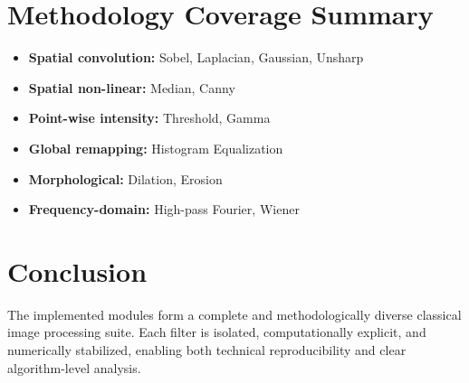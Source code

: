 \documentclass[11pt,a4paper]{article}
\begin{document}
\section{Methodology Coverage Summary}
\begin{itemize}[leftmargin=1.2cm]
  \item \textbf{Spatial convolution:} Sobel, Laplacian, Gaussian, Unsharp
  \item \textbf{Spatial non-linear:} Median, Canny
  \item \textbf{Point-wise intensity:} Threshold, Gamma
  \item \textbf{Global remapping:} Histogram Equalization
  \item \textbf{Morphological:} Dilation, Erosion
  \item \textbf{Frequency-domain:} High-pass Fourier, Wiener
\end{itemize}

\section{Conclusion}
The implemented modules form a complete and methodologically diverse classical image processing suite. Each filter is isolated, computationally explicit, and numerically stabilized, enabling both technical reproducibility and clear algorithm-level analysis.
\end{document}
